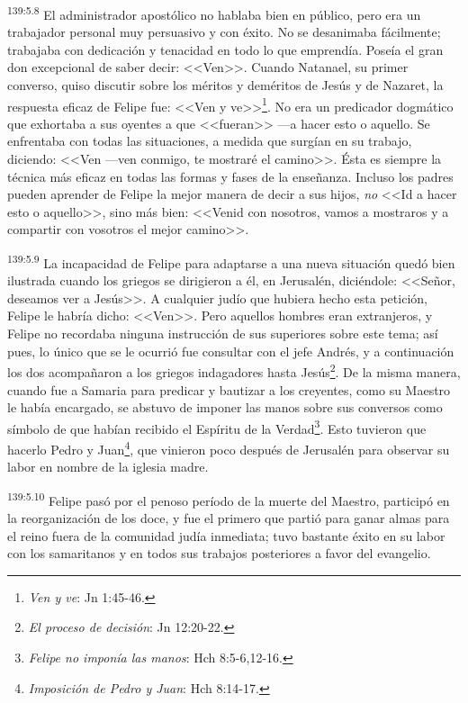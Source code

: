\par 
\textsuperscript{139:5.8} El administrador apostólico no hablaba bien en público, pero era un trabajador personal muy persuasivo y con éxito. No se desanimaba fácilmente; trabajaba con dedicación y tenacidad en todo lo que emprendía. Poseía el gran don excepcional de saber decir: <<Ven>>. Cuando Natanael, su primer converso, quiso discutir sobre los méritos y deméritos de Jesús y de Nazaret, la respuesta eficaz de Felipe fue: <<Ven y ve>>\footnote{\textit{Ven y ve}: Jn 1:45-46.}. No era un predicador dogmático que exhortaba a sus oyentes a que <<fueran>> ---a hacer esto o aquello. Se enfrentaba con todas las situaciones, a medida que surgían en su trabajo, diciendo: <<Ven ---ven conmigo, te mostraré el camino>>. Ésta es siempre la técnica más eficaz en todas las formas y fases de la enseñanza. Incluso los padres pueden aprender de Felipe la mejor manera de decir a sus hijos, \textit{no} <<Id a hacer esto o aquello>>, sino más bien: <<Venid con nosotros, vamos a mostraros y a compartir con vosotros el mejor camino>>.

\par 
\textsuperscript{139:5.9} La incapacidad de Felipe para adaptarse a una nueva situación quedó bien ilustrada cuando los griegos se dirigieron a él, en Jerusalén, diciéndole: <<Señor, deseamos ver a Jesús>>. A cualquier judío que hubiera hecho esta petición, Felipe le habría dicho: <<Ven>>. Pero aquellos hombres eran extranjeros, y Felipe no recordaba ninguna instrucción de sus superiores sobre este tema; así pues, lo único que se le ocurrió fue consultar con el jefe Andrés, y a continuación los dos acompañaron a los griegos indagadores hasta Jesús\footnote{\textit{El proceso de decisión}: Jn 12:20-22.}. De la misma manera, cuando fue a Samaria para predicar y bautizar a los creyentes, como su Maestro le había encargado, se abstuvo de imponer las manos sobre sus conversos como símbolo de que habían recibido el Espíritu de la Verdad\footnote{\textit{Felipe no imponía las manos}: Hch 8:5-6,12-16.}. Esto tuvieron que hacerlo Pedro y Juan\footnote{\textit{Imposición de Pedro y Juan}: Hch 8:14-17.}, que vinieron poco después de Jerusalén para observar su labor en nombre de la iglesia madre.

\par 
\textsuperscript{139:5.10} Felipe pasó por el penoso período de la muerte del Maestro, participó en la reorganización de los doce, y fue el primero que partió para ganar almas para el reino fuera de la comunidad judía inmediata; tuvo bastante éxito en su labor con los samaritanos y en todos sus trabajos posteriores a favor del evangelio.

